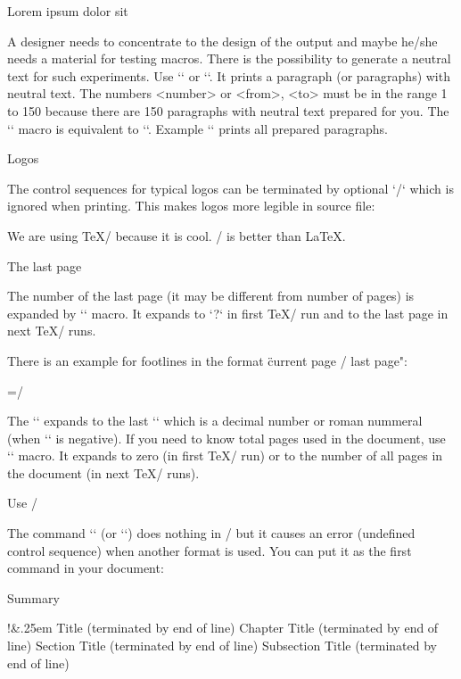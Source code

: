 {\secc Lorem ipsum dolor sit

\new
A designer needs to concentrate to the design of the output and maybe he/she 
needs a material for testing macros. There is the possibility to generate a
neutral text for such experiments. Use `\lorem[<number>]` or
`\lorem[<from>-<to>]`. It prints a paragraph (or paragraphs) with neutral
text. The numbers <number> or <from>, <to> must be in the range 1 to 150
because there are 150 paragraphs with neutral text prepared for you.
The `\lipsum` macro is equivalent to `\lorem`. Example `\lipsum[1-150]`
prints all prepared paragraphs.

\secc Logos

\new
The control sequences for typical logos can be terminated by optional `/`
which is ignored when printing. This makes logos more legible in source file:

\begtt
We are using \TeX/ because it is cool. \OpTeX/ is better than \LaTeX.
\endtt

\secc The last page

The number of the last page (it may be different from number of pages) is
expanded by `\lastpage` macro. It expands to `?` in first \TeX/ run and to
the last page in next \TeX/ runs. 

There is an example for footlines in the format \"current page / last page": 

\begtt
\footline={\hss \fixedrm \folio/\lastpage \hss}
\endtt

\new
The `\lastpage` expands to the last `\folio` which is a decimal
number or roman nummeral (when `\pageno` is negative). If you need to know
total pages used in the document, use `\totalpages` macro. It expands to 
zero (in first \TeX/ run) or to the number of all pages in the document
(in next \TeX/ runs). 

\secc Use \OpTeX/

\new
The command `\useOpTeX` (or `\useoptex`) does nothing in \OpTeX/ but it causes 
an error (undefined control sequence) when another format is used. You can
put it as the first command in your document:

\begtt
\useOpTeX %
\endtt

\sec Summary

\begtt     \typosize[10/12]\adef!{\string\endtt}\adef&{\kern.25em}
\tit Title (terminated by end of line)
\chap Chapter Title (terminated by end of line)
\sec Section Title (terminated by end of line)
\secc Subsection Title (terminated by end of line)

}
